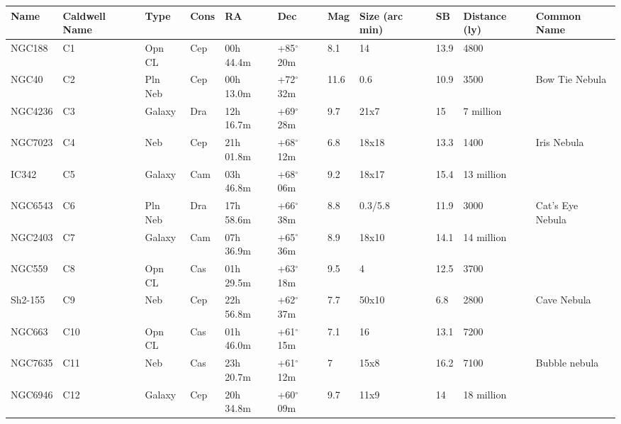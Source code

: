 \begin{longtable}{@{}lllllllllll@{}}
\hline
{\bf Name} & {\bf Caldwell Name} & {\bf Type} & {\bf Cons} & {\bf RA}  & {\bf Dec} & {\bf Mag} & {\bf Size (arc min)} & {\bf SB} & {\bf Distance (ly)} & {\bf Common Name}               \\
\hline
NGC188     & C1            & Opn CL  & Cep & 00h 44.4m & +85$^{\circ}$ 20m & 8.1  & 14             & 13.9 & 4800          &                                 \\
NGC40      & C2            & Pln Neb & Cep & 00h 13.0m & +72$^{\circ}$ 32m & 11.6 & 0.6            & 10.9 & 3500          & Bow Tie Nebula                  \\
NGC4236    & C3            & Galaxy  & Dra & 12h 16.7m & +69$^{\circ}$ 28m & 9.7  & 21x7           & 15   & 7 million     &                                 \\
NGC7023    & C4            & Neb     & Cep & 21h 01.8m & +68$^{\circ}$ 12m & 6.8  & 18x18          & 13.3 & 1400          & Iris Nebula                     \\
IC342      & C5            & Galaxy  & Cam & 03h 46.8m & +68$^{\circ}$ 06m & 9.2  & 18x17          & 15.4 & 13 million    &                                 \\
NGC6543    & C6            & Pln Neb & Dra & 17h 58.6m & +66$^{\circ}$ 38m & 8.8  & 0.3/5.8        & 11.9 & 3000          & Cat's Eye Nebula                \\
NGC2403    & C7            & Galaxy  & Cam & 07h 36.9m & +65$^{\circ}$ 36m & 8.9  & 18x10          & 14.1 & 14 million    &                                 \\
NGC559     & C8            & Opn CL  & Cas & 01h 29.5m & +63$^{\circ}$ 18m & 9.5  & 4              & 12.5 & 3700          &                                 \\
Sh2-155    & C9            & Neb     & Cep & 22h 56.8m & +62$^{\circ}$ 37m & 7.7  & 50x10          & 6.8  & 2800          & Cave Nebula                     \\
NGC663     & C10           & Opn CL  & Cas & 01h 46.0m & +61$^{\circ}$ 15m & 7.1  & 16             & 13.1 & 7200          &                                 \\
NGC7635    & C11           & Neb     & Cas & 23h 20.7m & +61$^{\circ}$ 12m & 7    & 15x8           & 16.2 & 7100          & Bubble nebula                   \\
NGC6946    & C12           & Galaxy  & Cep & 20h 34.8m & +60$^{\circ}$ 09m & 9.7  & 11x9           & 14   & 18 million    &                                 \\

\end{longtable}
